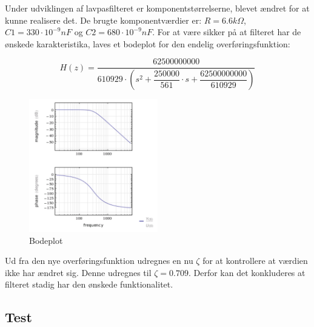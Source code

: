 Under udviklingen af lavpasfilteret er komponentstørrelserne, blevet ændret for at kunne realisere det. De brugte komponentværdier er: $ R= 6.6 k\Omega $, $ C1= 330\cdot 10 ^{-9} nF$ og $ C2= 680\cdot 10^{-9} nF$.   
For at være sikker på at filteret har de ønskede karakteristika, laves et bodeplot for den endelig overføringsfunktion: 
\begin{ceqn}
\begin{equation}
H(z)=\dfrac{62500000000}{610929\cdot \left( s^2+\dfrac{250000}{561}\cdot s + \dfrac{62500000000}{610929} \right)}
\end{equation}
\end{ceqn}
\begin{figure}[H]
	\centering
	\includegraphics[width=0.5\textwidth]{Figurer/Bodeplot}
	\caption{Bodeplot}
	\label{fig:bodeplot}
\end{figure}
Ud fra den nye overføringsfunktion udregnes en nu $ \zeta $ for at kontrollere at værdien ikke har ændret sig. Denne udregnes til $ \zeta = 0.709 $. Derfor kan det konkluderes at filteret stadig har den ønskede funktionalitet. 

\subsection{Test}
